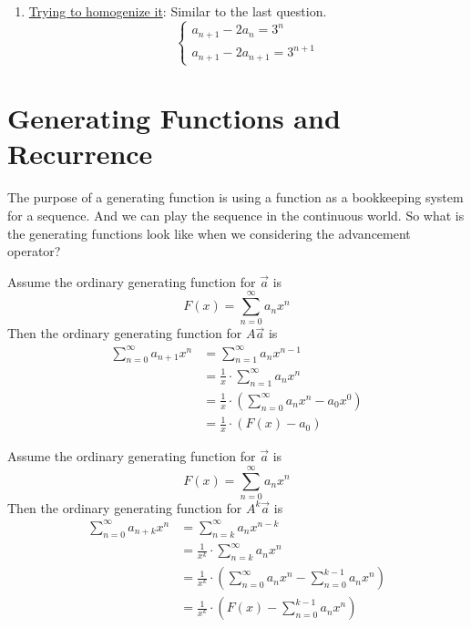 \begin{enumerate}
\begin{itemize}
\begin{enumerate}
            So $\vec{a_0}$ is the sequence $3^n$
            \item \underline{Trying to homogenize it}: Similar to the last question.\\
            \begin{equation}
                \begin{cases}
                    a_{n+1}-2a_n=3^n\\
                    a_{n+1}-2a_{n+1}=3^{n+1}
                \end{cases}
            \end{equation}
        \end{enumerate}
    \end{itemize}
\end{enumerate}


\section{Generating Functions and Recurrence}
The purpose of a generating function is using a function as a bookkeeping system for a sequence. And we can play the sequence in the continuous world. 
So what is the generating functions look like when we considering the advancement operator?

\begin{theorem}
    Assume the ordinary generating function for $\vec{a}$ is $$F(x)=\sum_{n=0}^{\infty}a_nx^n$$
    Then the ordinary generating function for $A\vec{a}$ is 
    \begin{equation}
        \begin{split}
            \sum_{n=0}^{\infty}a_{n+1}x^n &= \sum_{n=1}^{\infty}a_nx^{n-1}\\
            &= \frac{1}{x} \cdot \sum_{n=1}^{\infty}a_nx^n\\
            &= \frac{1}{x} \cdot (\sum_{n=0}^{\infty}a_nx^n -a_0x^0)\\
            &= \frac{1}{x} \cdot (F(x)-a_0)
        \end{split}
    \end{equation}
\end{theorem}

\begin{theorem}
    Assume the ordinary generating function for $\vec{a}$ is $$F(x)=\sum_{n=0}^{\infty}a_nx^n$$
    Then the ordinary generating function for $A^k\vec{a}$ is 
    \begin{equation}
        \begin{split}
            \sum_{n=0}^{\infty}a_{n+k}x^n &= \sum_{n=k}^{\infty}a_nx^{n-k}\\
            &= \frac{1}{x^k} \cdot \sum_{n=k}^{\infty}a_nx^n\\
            &= \frac{1}{x^k} \cdot (\sum_{n=0}^{\infty}a_nx^n -\sum_{n=0}^{k-1}a_nx^n)\\
            &= \frac{1}{x^k} \cdot (F(x)-\sum_{n=0}^{k-1}a_nx^n)
        \end{split}
    \end{equation}
\end{theorem}

